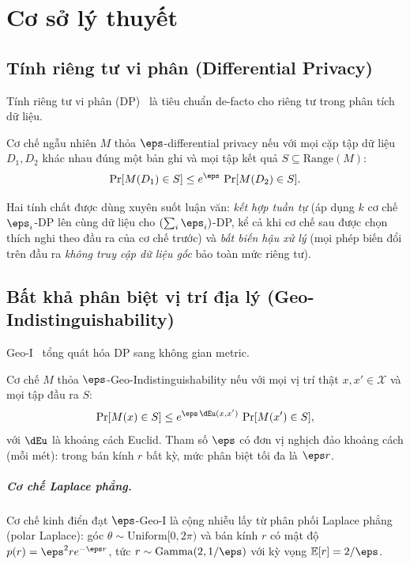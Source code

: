 \chapter{Cơ sở lý thuyết}
\label{ch:cosolythuyet}

\section{Tính riêng tư vi phân (Differential Privacy)}

Tính riêng tư vi phân (DP)~\cite{dwork2006calibrating} là tiêu chuẩn de-facto cho
riêng tư trong phân tích dữ liệu.

\begin{dinhnghia}[$\eps$-DP]
Cơ chế ngẫu nhiên $M$ thỏa $\eps$-differential privacy nếu với mọi cặp tập dữ
liệu $D_1, D_2$ khác nhau đúng một bản ghi và mọi tập kết quả
$S \subseteq \mathrm{Range}(M)$:
\[
\Pr[M(D_1) \in S] \le e^{\eps}\,\Pr[M(D_2) \in S].
\]
\end{dinhnghia}

Hai tính chất được dùng xuyên suốt luận văn:
\emph{kết hợp tuần tự} (áp dụng $k$ cơ chế $\eps_i$-DP lên cùng dữ liệu cho
$(\sum_i \eps_i)$-DP, kể cả khi cơ chế sau được chọn thích nghi theo đầu ra của
cơ chế trước) và \emph{bất biến hậu xử lý} (mọi phép biến đổi trên đầu ra
\emph{không truy cập dữ liệu gốc} bảo toàn mức riêng tư).

\section{Bất khả phân biệt vị trí địa lý (Geo-Indistinguishability)}

Geo-I~\cite{andres2013geo} tổng quát hóa DP sang không gian metric.

\begin{dinhnghia}
\label{def:geoi}
Cơ chế $M$ thỏa $\eps$-Geo-Indistinguishability nếu với mọi vị trí thật
$x, x' \in \mathcal{X}$ và mọi tập đầu ra $S$:
\[
\Pr[M(x) \in S] \le e^{\eps\,\dEu(x,x')}\,\Pr[M(x') \in S],
\]
với $\dEu$ là khoảng cách Euclid. Tham số $\eps$ có đơn vị nghịch đảo khoảng
cách (mỗi mét): trong bán kính $r$ bất kỳ, mức phân biệt tối đa là $\eps r$.
\end{dinhnghia}

\paragraph{Cơ chế Laplace phẳng.} Cơ chế kinh điển đạt $\eps$-Geo-I là cộng nhiễu
lấy từ phân phối Laplace phẳng (polar Laplace): góc
$\theta \sim \mathrm{Uniform}[0, 2\pi)$ và bán kính $r$ có mật độ
$p(r) = \eps^2 r e^{-\eps r}$, tức $r \sim \mathrm{Gamma}(2, 1/\eps)$ với kỳ vọng
$\mathbb{E}[r] = 2/\eps$.

